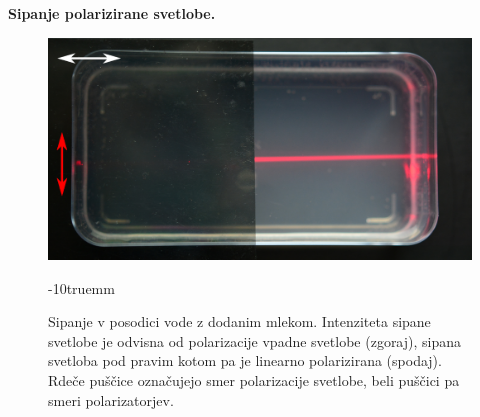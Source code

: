 \begin{example}{\bf Sipanje polarizirane svetlobe.}
\begin{figure}[!h]
\includegraphics[width=7truecm]{slike/07_Mleko4.jpg}
\caption{Sipanje v posodici vode z dodanim mlekom. Intenziteta sipane svetlobe je odvisna 
od polarizacije vpadne svetlobe (zgoraj), sipana svetloba pod pravim kotom pa je linearno
polarizirana (spodaj). Rdeče puščice označujejo smer polarizacije svetlobe, beli puščici
pa smeri polarizatorjev.}
\label{fig:07_mleko}
\vglue-10truemm
\end{figure}

\end{example}

